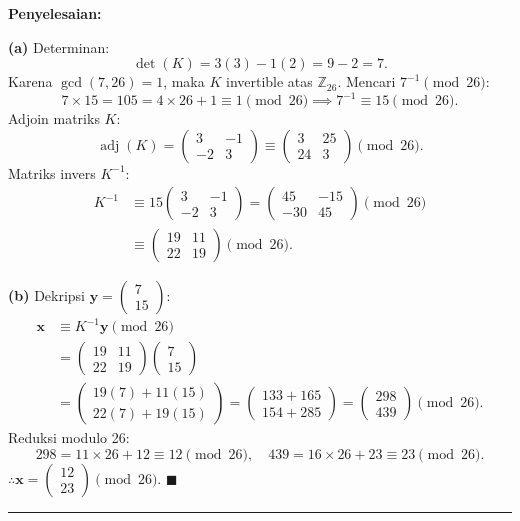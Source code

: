 \documentclass[11pt,a4paper]{article}
\newenvironment{solusi}{\noindent\textbf{\textsf{Penyelesaian:}}\par\vspace{0.2em}}{\hfill$\blacksquare$\vspace{1em}\par\hrule\vspace{1em}}
\begin{document}
\begin{solusi}
\textbf{(a)} Determinan:
\[
\det(K) = 3(3) - 1(2) = 9 - 2 = 7.
\]
Karena $\gcd(7, 26) = 1$, maka $K$ invertible atas $\mathbb{Z}_{26}$.
Mencari $7^{-1} \pmod{26}$:
\[
7 \times 15 = 105 = 4 \times 26 + 1 \equiv 1 \pmod{26} \implies 7^{-1} \equiv 15 \pmod{26}.
\]
Adjoin matriks $K$:
\[
\operatorname{adj}(K) = \begin{pmatrix} 3 & -1 \\ -2 & 3 \end{pmatrix} \equiv \begin{pmatrix} 3 & 25 \\ 24 & 3 \end{pmatrix} \pmod{26}.
\]
Matriks invers $K^{-1}$:
\begin{align*}
K^{-1} &\equiv 15 \begin{pmatrix} 3 & -1 \\ -2 & 3 \end{pmatrix} = \begin{pmatrix} 45 & -15 \\ -30 & 45 \end{pmatrix} \pmod{26} \\
&\equiv \begin{pmatrix} 19 & 11 \\ 22 & 19 \end{pmatrix} \pmod{26}.
\end{align*}

\textbf{(b)} Dekripsi $\mathbf{y} = \begin{pmatrix} 7 \\ 15 \end{pmatrix}$:
\begin{align*}
\mathbf{x} &\equiv K^{-1} \mathbf{y} \pmod{26} \\
&= \begin{pmatrix} 19 & 11 \\ 22 & 19 \end{pmatrix} \begin{pmatrix} 7 \\ 15 \end{pmatrix} \\
&= \begin{pmatrix} 19(7) + 11(15) \\ 22(7) + 19(15) \end{pmatrix} = \begin{pmatrix} 133 + 165 \\ 154 + 285 \end{pmatrix} = \begin{pmatrix} 298 \\ 439 \end{pmatrix} \pmod{26}.
\end{align*}
Reduksi modulo 26:
\[
298 = 11 \times 26 + 12 \equiv 12 \pmod{26}, \quad 439 = 16 \times 26 + 23 \equiv 23 \pmod{26}.
\]
$\therefore \mathbf{x} = \begin{pmatrix} 12 \\ 23 \end{pmatrix} \pmod{26}$.
\end{solusi}
\end{document}
